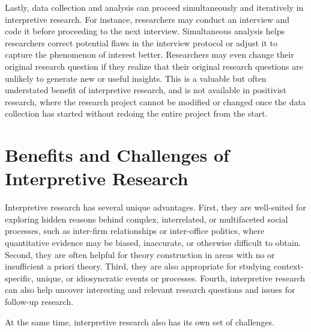 Lastly, data collection and analysis can proceed simultaneously and iteratively in interpretive research. For instance, researchers may conduct an interview and code it before proceeding to the next interview. Simultaneous analysis helps researchers correct potential flaws in the interview protocol or adjust it to capture the phenomenon of interest better. Researchers may even change their original research question if they realize that their original research questions are unlikely to generate new or useful insights. This is a valuable but often understated benefit of interpretive research, and is not available in positivist research, where the research project cannot be modified or changed once the data collection has started without redoing the entire project from the start.

\section{Benefits and Challenges of Interpretive Research}

Interpretive research has several unique advantages. First, they are well-suited for exploring hidden reasons behind complex, interrelated, or multifaceted social processes, such as inter-firm relationships or inter-office politics, where quantitative evidence may be biased, inaccurate, or otherwise difficult to obtain. Second, they are often helpful for theory construction in areas with no or insufficient a priori theory. Third, they are also appropriate for studying context-specific, unique, or idiosyncratic events or processes. Fourth, interpretive research can also help uncover interesting and relevant research questions and issues for follow-up research.

At the same time, interpretive research also has its own set of challenges.

